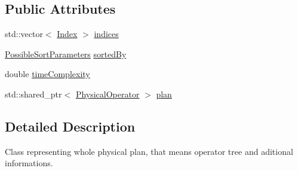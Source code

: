 \subsection*{Public Attributes}
\begin{DoxyCompactItemize}
\item 
std\+::vector$<$ \hyperlink{class_index}{Index} $>$ \hyperlink{class_physical_plan_a4d8ba56ef7d228a2a11176da541af5ef}{indices}
\item 
\hyperlink{class_possible_sort_parameters}{Possible\+Sort\+Parameters} \hyperlink{class_physical_plan_a6a49fcbbcb8e22d1f573106de5847c45}{sorted\+By}
\item 
double \hyperlink{class_physical_plan_a2176d32a64b58406206181395c4127bc}{time\+Complexity}
\item 
std\+::shared\+\_\+ptr$<$ \hyperlink{class_physical_operator}{Physical\+Operator} $>$ \hyperlink{class_physical_plan_a97349262f468410057d66f00334003a5}{plan}
\end{DoxyCompactItemize}


\subsection{Detailed Description}
Class representing whole physical plan, that means operator tree and aditional informations. 

